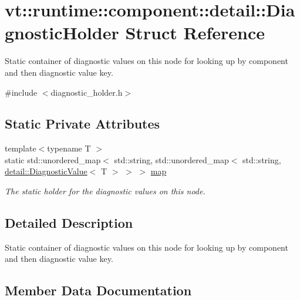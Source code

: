 \hypertarget{structvt_1_1runtime_1_1component_1_1detail_1_1_diagnostic_holder}{}\section{vt\+:\+:runtime\+:\+:component\+:\+:detail\+:\+:Diagnostic\+Holder Struct Reference}
\label{structvt_1_1runtime_1_1component_1_1detail_1_1_diagnostic_holder}


Static container of diagnostic values on this node for looking up by component and then diagnostic value key.  




{\ttfamily \#include $<$diagnostic\+\_\+holder.\+h$>$}

\subsection*{Static Private Attributes}
\begin{DoxyCompactItemize}
\item 
{\footnotesize template$<$typename T $>$ }\\static std\+::unordered\+\_\+map$<$ std\+::string, std\+::unordered\+\_\+map$<$ std\+::string, \hyperlink{structvt_1_1runtime_1_1component_1_1detail_1_1_diagnostic_value}{detail\+::\+Diagnostic\+Value}$<$ T $>$ $>$ $>$ \hyperlink{structvt_1_1runtime_1_1component_1_1detail_1_1_diagnostic_holder_a77c969ecae0151a18619c0d50a8761fc}{map}
\begin{DoxyCompactList}\small\item\em The static holder for the diagnostic values on this node. \end{DoxyCompactList}\end{DoxyCompactItemize}


\subsection{Detailed Description}
Static container of diagnostic values on this node for looking up by component and then diagnostic value key. 

\subsection{Member Data Documentation}
\mbox{\label{structvt_1_1runtime_1_1component_1_1detail_1_1_diagnostic_holder_a77c969ecae0151a18619c0d50a8761fc}} 
